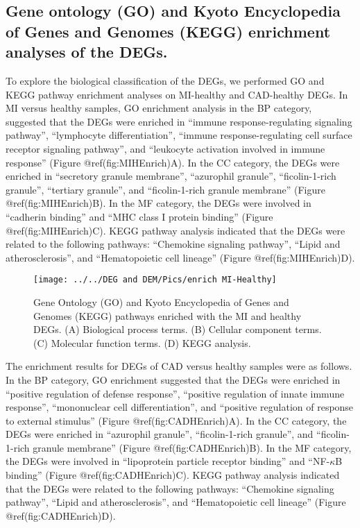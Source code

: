 \documentclass[smallextended]{svjour3}       %
\begin{document}
\hypertarget{gene-ontology-go-and-kyoto-encyclopedia-of-genes-and-genomes-kegg-enrichment-analyses-of-the-degs.}{%
\subsection{Gene ontology (GO) and Kyoto Encyclopedia of Genes and
Genomes (KEGG) enrichment analyses of the
DEGs.}\label{gene-ontology-go-and-kyoto-encyclopedia-of-genes-and-genomes-kegg-enrichment-analyses-of-the-degs.}}

To explore the biological classification of the DEGs, we performed GO
and KEGG pathway enrichment analyses on MI-healthy and CAD-healthy DEGs.
In MI versus healthy samples, GO enrichment analysis in the BP category,
suggested that the DEGs were enriched in ``immune response-regulating
signaling pathway'', ``lymphocyte differentiation'', ``immune
response-regulating cell surface receptor signaling pathway'', and
``leukocyte activation involved in immune response'' (Figure
@ref(fig:MIHEnrich)A). In the CC category, the DEGs were enriched in
``secretory granule membrane'', ``azurophil granule'', ``ficolin-1-rich
granule'', ``tertiary granule'', and ``ficolin-1-rich granule membrane''
(Figure @ref(fig:MIHEnrich)B). In the MF category, the DEGs were
involved in ``cadherin binding'' and ``MHC class I protein binding''
(Figure @ref(fig:MIHEnrich)C). KEGG pathway analysis indicated that the
DEGs were related to the following pathways: ``Chemokine signaling
pathway'', ``Lipid and atherosclerosis'', and ``Hematopoietic cell
lineage'' (Figure @ref(fig:MIHEnrich)D).

\begin{figure}
\texttt{[image: ../../DEG and DEM/Pics/enrich MI-Healthy]} \caption{Gene Ontology (GO) and Kyoto Encyclopedia of Genes and Genomes (KEGG) pathways enriched with the MI and healthy DEGs. (A) Biological process terms. (B) Cellular component terms. (C) Molecular function terms. (D) KEGG analysis.}\label{fig:MIHEnrich}
\end{figure}

The enrichment results for DEGs of CAD versus healthy samples were as
follows. In the BP category, GO enrichment suggested that the DEGs were
enriched in ``positive regulation of defense response'', ``positive
regulation of innate immune response'', ``mononuclear cell
differentiation'', and ``positive regulation of response to external
stimulus'' (Figure @ref(fig:CADHEnrich)A). In the CC category, the DEGs
were enriched in ``azurophil granule'', ``ficolin-1-rich granule'', and
``ficolin-1-rich granule membrane'' (Figure @ref(fig:CADHEnrich)B). In
the MF category, the DEGs were involved in ``lipoprotein particle
receptor binding'' and ``NF-\(\kappa\)B binding'' (Figure
@ref(fig:CADHEnrich)C). KEGG pathway analysis indicated that the DEGs
were related to the following pathways: ``Chemokine signaling pathway'',
``Lipid and atherosclerosis'', and ``Hematopoietic cell lineage''
(Figure @ref(fig:CADHEnrich)D).
\end{document}
